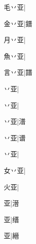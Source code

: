 \begin{multicols}{2}
{{\cjk{}毛丷亚}|{}\par
{\cjk{}金丷亚}\mktsJzrVerticalBar{}{\cjk{}{\cnsym{}　}{\cnsym{}　}{\cnsym{}　}}|{\cjk{}鐠}\par
{\cjk{}月丷亚}\mktsJzrVerticalBar{}{\cjk{}{\cnsym{}　}{\cnsym{}　}{\cnsym{}　}}|{}\par
{\cjk{}魚丷亚}\mktsJzrVerticalBar{}{\cjk{}{\cnsym{}　}{\cnsym{}　}{\cnsym{}　}}|{}\par
{\cjk{}言丷亚}\mktsJzrVerticalBar{}{\cjk{}{\cnsym{}　}{\cnsym{}　}{\cnsym{}　}}|{\cjk{}譜}\par
{丷亚}\mktsJzrVerticalBar{}{\cjk{}{\cnsym{}　}{\cnsym{}　}{\cnsym{}　}}|{}\par
{丷亚}\mktsJzrVerticalBar{}{\cjk{}{\cnsym{}　}{\cnsym{}　}{\cnsym{}　}}|{}\par
{丷亚}\mktsJzrVerticalBar{}{\cjk{}{\cnsym{}　}{\cnsym{}　}{\cnsym{}　}}|{\cjk{}潽}\par
{丷亚}\mktsJzrVerticalBar{}{\cjk{}{\cnsym{}　}{\cnsym{}　}{\cnsym{}　}}|{\cjk{}谱}\par
{丷亚}\mktsJzrVerticalBar{}{\cjk{}{\cnsym{}　}{\cnsym{}　}{\cnsym{}　}}|{}\par
{\cjk{}女丷亚}\mktsJzrVerticalBar{}{\cjk{}{\cnsym{}　}{\cnsym{}　}{\cnsym{}　}}|{}\par
{\cjk{}{\cnsym{}　}火亚}\mktsJzrVerticalBar{}{\cjk{}{\cnsym{}　}{\cnsym{}　}{\cnsym{}　}}|{}\par
{亚}\mktsJzrVerticalBar{}{\cjk{}{\cnsym{}　}{\cnsym{}　}{\cnsym{}　}}|{\cjk{}溍}\par
{亚}\mktsJzrVerticalBar{}{\cjk{}{\cnsym{}　}{\cnsym{}　}{\cnsym{}　}}|{\cjk{}缙}\par
{亚}\mktsJzrVerticalBar{}{\cjk{}{\cnsym{}　}{\cnsym{}　}{\cnsym{}　}}|{\cjk{}縉}\par
}
\end{multicols}
